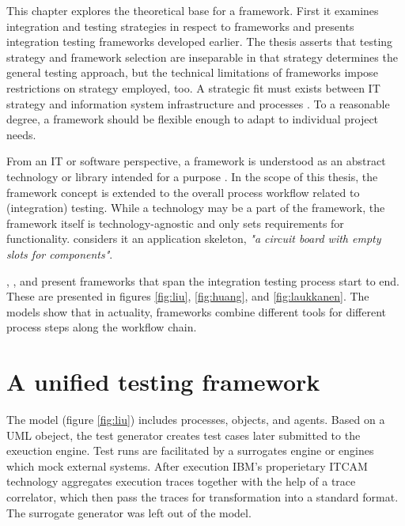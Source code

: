 \documentclass[12pt,a4paper,oneside,pdftex]{report}
\begin{document}
This chapter explores the theoretical base for a framework. First it examines integration and testing strategies in respect to frameworks and presents integration testing frameworks developed earlier. The thesis asserts that testing strategy and framework selection are inseparable in that strategy determines the general testing approach, but the technical limitations of frameworks impose restrictions on strategy employed, too. A strategic fit must exists between IT strategy and information system infrastructure and processes \citep{henderson1993strategic}. To a reasonable degree, a framework should be flexible enough to adapt to individual project needs.
\citep{rehman2007testing}

From an IT or software perspective, a framework is understood as an abstract technology or library intended for a purpose \citep{johnson1988designing}. In the scope of this thesis, the framework concept is extended to the overall process workflow related to (integration) testing. While a technology may be a part of the framework, the framework itself is technology-agnostic and only sets requirements for functionality. \citet{pezze2008software} considers it an application skeleton, \textit{"a circuit board with empty slots for components"}.

\citet{liu2009unified}, \citet{huang2008surrogate}, and \citet{laukkanen2006data} present frameworks that span the integration testing process start to end. These are presented in figures \ref{fig:liu}, \ref{fig:huang}, and \ref{fig:laukkanen}. The models show that in actuality, frameworks combine different tools for different process steps along the workflow chain.

\section{A unified testing framework}

The \citet{liu2009unified} model (figure \ref{fig:liu}) includes processes, objects, and agents. Based on a UML obeject, the test generator creates test cases later submitted to the exeuction engine. Test runs are facilitated by a surrogates engine or engines which mock external systems. After execution IBM's properietary ITCAM technology aggregates execution traces together with the help of a trace correlator, which then pass the traces for transformation into a standard format. 
The surrogate generator was left out of the model.
\end{document}
